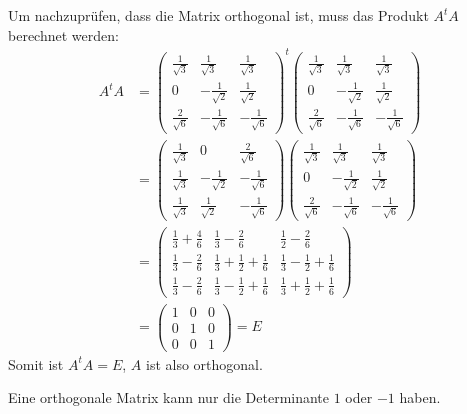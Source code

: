 \begin{loesung}
\begin{teilaufgaben}
\item
Um nachzuprüfen, dass die Matrix orthogonal ist, muss das Produkt
$A^tA$ berechnet werden:
\begin{align*}
A^tA
&=
\begin{pmatrix}
\frac1{\sqrt{3}}&\frac1{\sqrt{3}}&\frac1{\sqrt{3}}\\
0&-\frac1{\sqrt{2}}&\frac1{\sqrt{2}}\\
\frac2{\sqrt{6}}&-\frac1{\sqrt{6}}&-\frac1{\sqrt{6}}
\end{pmatrix}^t
\begin{pmatrix}
\frac1{\sqrt{3}}&\frac1{\sqrt{3}}&\frac1{\sqrt{3}}\\
0&-\frac1{\sqrt{2}}&\frac1{\sqrt{2}}\\
\frac2{\sqrt{6}}&-\frac1{\sqrt{6}}&-\frac1{\sqrt{6}}
\end{pmatrix}
\\
&=
\begin{pmatrix}
\frac1{\sqrt{3}}&0&\frac2{\sqrt{6}}\\
\frac1{\sqrt{3}}&-\frac1{\sqrt{2}}&-\frac1{\sqrt{6}}\\
\frac1{\sqrt{3}}&\frac1{\sqrt{2}}&-\frac1{\sqrt{6}}
\end{pmatrix}
\begin{pmatrix}
\frac1{\sqrt{3}}&\frac1{\sqrt{3}}&\frac1{\sqrt{3}}\\
0&-\frac1{\sqrt{2}}&\frac1{\sqrt{2}}\\
\frac2{\sqrt{6}}&-\frac1{\sqrt{6}}&-\frac1{\sqrt{6}}
\end{pmatrix}
\\
&=
\begin{pmatrix}
\frac13+\frac46 & \frac13-\frac26         & \frac12 -\frac26       \\
\frac13-\frac26 & \frac13+\frac12+\frac16 & \frac13-\frac12+\frac16\\
\frac13-\frac26 & \frac13-\frac12+\frac16 & \frac13+\frac12+\frac16
\end{pmatrix}
\\
&=\begin{pmatrix}
1&0&0\\
0&1&0\\
0&0&1
\end{pmatrix}
=E
\end{align*}
Somit ist $A^tA=E$, $A$ ist also orthogonal.
\item
Eine orthogonale Matrix kann nur die Determinante $1$ oder $-1$ haben.

\end{teilaufgaben}
\end{loesung}
